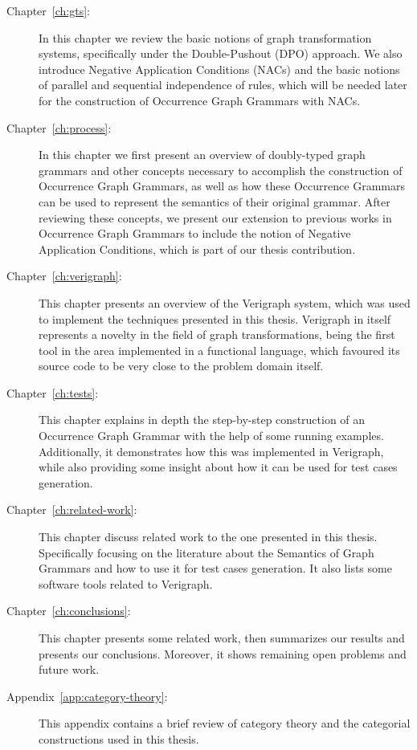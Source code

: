 \begin{description}
	\item[Chapter~\ref{ch:gts}:] In this chapter we review the basic notions of graph transformation systems, specifically under the Double-Pushout (DPO) approach. We also introduce Negative Application Conditions (NACs) and the basic notions of parallel and sequential independence of rules, which will be needed later for the construction of Occurrence Graph Grammars with NACs.

  \item[Chapter~\ref{ch:process}:] In this chapter we first present an overview of doubly-typed graph grammars and other concepts necessary to accomplish the construction of Occurrence Graph Grammars, as well as how these Occurrence Grammars can be used to represent the semantics of their original grammar. After reviewing these concepts, we present our extension to previous works in Occurrence Graph Grammars to include the notion of Negative Application Conditions, which is part of our thesis contribution.

  \item[Chapter~\ref{ch:verigraph}:] This chapter presents an overview of the Verigraph system, which was used to implement the techniques presented in this thesis. Verigraph in itself represents a novelty in the field of graph transformations, being the first tool in the area implemented in a functional language, which favoured its source code to be very close to the problem domain itself.

  \item[Chapter~\ref{ch:tests}:] This chapter explains in depth the step-by-step construction of an Occurrence Graph Grammar with the help of some running examples. Additionally, it demonstrates how this was implemented in Verigraph, while also providing some insight about how it can be used for test cases generation.

  \item[Chapter~\ref{ch:related-work}:] This chapter discuss related work to the one presented in this thesis. Specifically focusing on the literature about the Semantics of Graph Grammars and how to use it for test cases generation. It also lists some software tools related to Verigraph.

  \item[Chapter~\ref{ch:conclusions}:] This chapter presents some related work, then summarizes our results and presents our conclusions. Moreover, it shows remaining open problems and future work.

  \item[Appendix~\ref{app:category-theory}:] This appendix contains a brief review of category theory and the categorial constructions used in this thesis.

\end{description}
